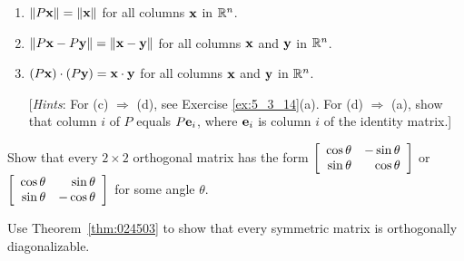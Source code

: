\begin{multicols}{2}
\begin{ex}
\begin{enumerate}[label={\alph*.}]
\item $\| P\textbf{x}\| = \|\textbf{x}\|$ for all columns $\textbf{x}$ in $\mathbb{R}^n$.

\item $\| P\textbf{x} - P\textbf{y}\| = \|\textbf{x} - \textbf{y}\|$ for all columns $\textbf{x}$ and $\textbf{y}$ in $\mathbb{R}^n$.

\item $(P\textbf{x}) \cdot (P\textbf{y}) = \textbf{x} \cdot \textbf{y}$ for all columns $\textbf{x}$ and $\textbf{y}$ in $\mathbb{R}^n$.


[\textit{Hints}: For (c) $\Rightarrow$ (d), see Exercise \ref{ex:5_3_14}(a). For (d) $\Rightarrow$ (a), show that column $i$ of $P$ equals $P\textbf{e}_{i}$, where $\textbf{e}_{i}$ is column $i$ of the identity matrix.]

\end{enumerate}
\end{ex}

\columnbreak 

\begin{ex}
Show that every $2 \times 2$ orthogonal matrix has the form $\left[ \begin{array}{rr}
\cos\theta & -\sin\theta \\
\sin\theta & \cos\theta
\end{array}\right]$ or $\left[ \begin{array}{rr}
\cos\theta & \sin\theta \\
\sin\theta & -\cos\theta
\end{array}\right]$
 for some angle $\theta$. \newline [\textit{Hint}: If $a^{2} + b^{2} = 1$, then $a = \cos\theta$ and $b = \sin\theta$ for some angle $\theta$.]
\end{ex}

\begin{ex}
Use Theorem~\ref{thm:024503} to show that every symmetric matrix is orthogonally diagonalizable.
\end{ex}
\end{multicols}
